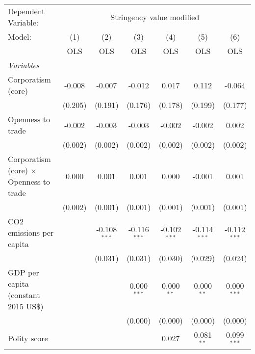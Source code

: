 
\begingroup
\centering
\begin{tabular}{lcccccc}
   \toprule
   Dependent Variable: & \multicolumn{6}{c}{Stringency value modified}\\
   Model:                                         & (1)     & (2)            & (3)            & (4)            & (5)            & (6)\\  
                                                  &  OLS    & OLS            & OLS            & OLS            & OLS            & OLS\\  
   \midrule
   \emph{Variables}\\
   Corporatism (core)                             & -0.008  & -0.007         & -0.012         & 0.017          & 0.112          & -0.064\\   
                                                  & (0.205) & (0.191)        & (0.176)        & (0.178)        & (0.199)        & (0.177)\\   
   Openness to trade                              & -0.002  & -0.003         & -0.003         & -0.002         & -0.002         & 0.002\\   
                                                  & (0.002) & (0.002)        & (0.002)        & (0.002)        & (0.002)        & (0.002)\\   
   Corporatism (core) $\times$ Openness to trade  & 0.000   & 0.001          & 0.001          & 0.000          & -0.001         & 0.001\\   
                                                  & (0.002) & (0.001)        & (0.001)        & (0.001)        & (0.001)        & (0.001)\\   
   CO2 emissions per capita                       &         & -0.108$^{***}$ & -0.116$^{***}$ & -0.102$^{***}$ & -0.114$^{***}$ & -0.112$^{***}$\\   
                                                  &         & (0.031)        & (0.031)        & (0.030)        & (0.029)        & (0.024)\\   
   GDP per capita (constant 2015 US\$)            &         &                & 0.000$^{***}$  & 0.000$^{**}$   & 0.000$^{**}$   & 0.000$^{***}$\\   
                                                  &         &                & (0.000)        & (0.000)        & (0.000)        & (0.000)\\   
   Polity score                                   &         &                &                & 0.027          & 0.081$^{**}$   & 0.099$^{***}$\\   

\end{tabular}
